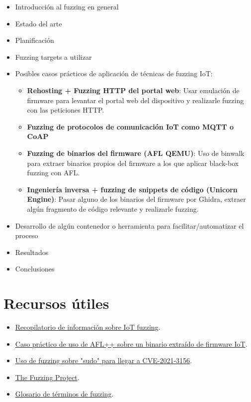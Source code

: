 \documentclass[11pt, a4paper, openany]{report}
\begin{document}
    \begin{itemize}
        \item Introducción al fuzzing en general
        \item Estado del arte
        \item Planificación
        \item Fuzzing targets a utilizar
        \item Posibles casos prácticos de aplicación de técnicas de fuzzing IoT:
        \begin{itemize}
            \item \textbf{Rehosting + Fuzzing HTTP del portal web}: Usar emulación de firmware
            para levantar el portal web del dispositivo y realizarle fuzzing con las peticiones HTTP.
            \item \textbf{Fuzzing de protocolos de comunicación IoT como MQTT o CoAP}
            \item \textbf{Fuzzing de binarios del firmware (AFL QEMU)}: Uso de binwalk para extraer
            binarios propios del firmware a los que aplicar black-box fuzzing con AFL.
            \item \textbf{Ingeniería inversa + fuzzing de snippets de código (Unicorn Engine)}:
            Pasar alguno de los binarios del firmware por Ghidra, extraer algún fragmento de código
            relevante y realizarle fuzzing.
        \end{itemize}
        \item Desarrollo de algún contenedor o herramienta para facilitar/automatizar el proceso
        \item Resultados
        \item Conclusiones
    \end{itemize}

    \section{Recursos útiles}
    \begin{itemize}
        \item \href{https://github.com/andreia-oca/awesome-embedded-fuzzing}{Recopilatorio de información sobre
         IoT fuzzing}.
        \item \href{https://blog.attify.com/fuzzing-iot-devices-part-1/}{Caso práctico de uso de AFL++ sobre un 
        binario extraído de firmware IoT}.
         \item \href{https://www.youtube.com/playlist?list=PLhixgUqwRTjy0gMuT4C3bmjeZjuNQyqdx}{Uso de fuzzing sobre
        "sudo" para llegar a CVE-2021-3156}.
        \item \href{https://fuzzing-project.org/tutorials.html}{The Fuzzing Project}.
        \item \href{https://github.com/google/fuzzing/blob/master/docs/glossary.md}{Glosario de términos de fuzzing}.

    \end{itemize}
    
\end{document}
